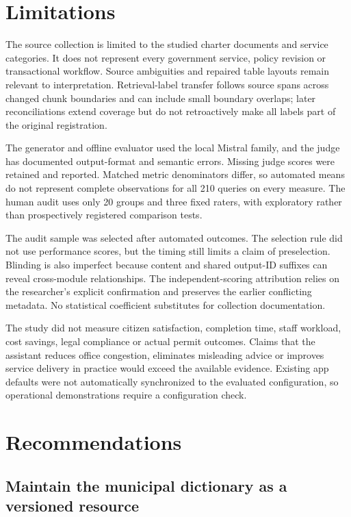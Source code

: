 \section{Limitations}

The source collection is limited to the studied charter documents and service categories. It does not represent every government service, policy revision or transactional workflow. Source ambiguities and repaired table layouts remain relevant to interpretation. Retrieval-label transfer follows source spans across changed chunk boundaries and can include small boundary overlaps; later reconciliations extend coverage but do not retroactively make all labels part of the original registration.


The generator and offline evaluator used the local Mistral family, and the judge has documented output-format and semantic errors. Missing judge scores were retained and reported. Matched metric denominators differ, so automated means do not represent complete observations for all 210 queries on every measure. The human audit uses only 20 groups and three fixed raters, with exploratory rather than prospectively registered comparison tests.


The audit sample was selected after automated outcomes. The selection rule did not use performance scores, but the timing still limits a claim of preselection. Blinding is also imperfect because content and shared output-ID suffixes can reveal cross-module relationships. The independent-scoring attribution relies on the researcher's explicit confirmation and preserves the earlier conflicting metadata. No statistical coefficient substitutes for collection documentation.


The study did not measure citizen satisfaction, completion time, staff workload, cost savings, legal compliance or actual permit outcomes. Claims that the assistant reduces office congestion, eliminates misleading advice or improves service delivery in practice would exceed the available evidence. Existing app defaults were not automatically synchronized to the evaluated configuration, so operational demonstrations require a configuration check.


\section{Recommendations}

\subsection{Maintain the municipal dictionary as a versioned resource}

